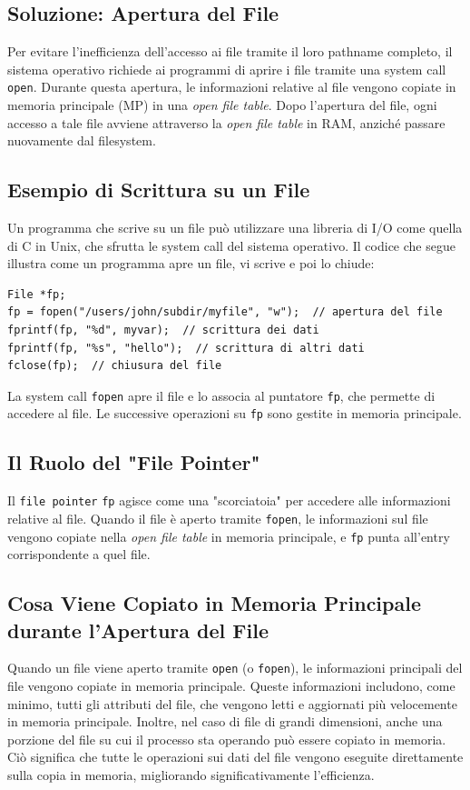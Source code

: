 \subsection{Soluzione: Apertura del File}
Per evitare l'inefficienza dell'accesso ai file tramite il loro pathname completo, il sistema operativo richiede ai programmi di aprire i file tramite una system call \texttt{open}. Durante questa apertura, le informazioni relative al file vengono copiate in memoria principale (MP) in una \textit{open file table}.
Dopo l'apertura del file, ogni accesso a tale file avviene attraverso la \textit{open file table} in RAM, anziché passare nuovamente dal filesystem.

\subsection{Esempio di Scrittura su un File}
Un programma che scrive su un file può utilizzare una libreria di I/O come quella di C in Unix, che sfrutta le system call del sistema operativo. Il codice che segue illustra come un programma apre un file, vi scrive e poi lo chiude:

\begin{verbatim}
File *fp;
fp = fopen("/users/john/subdir/myfile", "w");  // apertura del file
fprintf(fp, "%d", myvar);  // scrittura dei dati
fprintf(fp, "%s", "hello");  // scrittura di altri dati
fclose(fp);  // chiusura del file
\end{verbatim}
La system call \texttt{fopen} apre il file e lo associa al puntatore \texttt{fp}, che permette di accedere al file. Le successive operazioni su \texttt{fp} sono gestite in memoria principale.

\subsection{Il Ruolo del "File Pointer"}
Il \texttt{file pointer} \texttt{fp} agisce come una "scorciatoia" per accedere alle informazioni relative al file. Quando il file è aperto tramite \texttt{fopen}, le informazioni sul file vengono copiate nella \textit{open file table} in memoria principale, e \texttt{fp} punta all'entry corrispondente a quel file.


\subsection{Cosa Viene Copiato in Memoria Principale durante l'Apertura del File}
Quando un file viene aperto tramite \texttt{open} (o \texttt{fopen}), le informazioni principali del file vengono copiate in memoria principale. Queste informazioni includono, come minimo, tutti gli attributi del file, che vengono letti e aggiornati più velocemente in memoria principale. Inoltre, nel caso di file di grandi dimensioni, anche una porzione del file su cui il processo sta operando può essere copiato in memoria.
Ciò significa che tutte le operazioni sui dati del file vengono eseguite direttamente sulla copia in memoria, migliorando significativamente l'efficienza.

